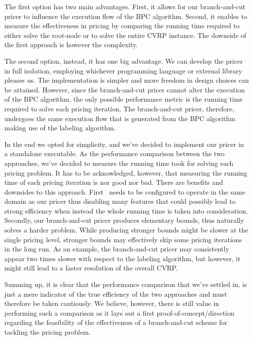 The first option has two main advantages.
First, it allows for our branch-and-cut pricer to influence the execution flow of the BPC algorithm.
Second, it enables to measure the effectiveness in pricing by comparing
the running time required to either solve the root-node or to solve the entire CVRP instance.
The downside of the first approach is however the complexity.

The second option, instead, it has one big advantage.
We can develop the pricer in full isolation, employing whichever programming
language or external library pleases us.
The implementation is simpler and more freedom in design choices can be attained.
However, since the branch-and-cut pricer cannot alter the execution of the BPC algorithm,
the only possible performance metric is the running time required to solve
each pricing iteration.
The branch-and-cut pricer, therefore, undergoes
the same execution flow that is generated from the BPC algorithm making use of the labeling algorithm.

\medskip

In the end we opted for simplicity, and we've decided to implement our pricer in a standalone executable.
As the performance comparison between the two approaches, we've decided to measure
the running time took for solving each pricing problem.
It has to be acknowledged, however, that measuring the running time of each pricing iteration
is nor good nor bad.
There are benefits and downsides to this approach.
First \bapcod\ needs to be configured to operate in the same domain as our pricer
thus disabling many features that could possibly lead to strong efficiency
when instead the whole running time is taken into consideration.
Secondly, our branch-and-cut pricer produces elementary bounds, thus naturally solves a harder problem.
While producing stronger bounds might be slower at the single pricing level, stronger bounds
may effectively skip some pricing iterations in the long run.
As an example, the branch-and-cut pricer may consistently appear two times slower with
respect to the labeling algorithm, but however, it might still
lead to a faster resolution of the overall CVRP.

Summing up, it is clear that the performance comparison that we've settled in, is just
a mere indicator of the true efficiency of the two approaches and must
therefore be taken cautiously.
We believe, however, there is still value in performing such a comparison as it lays
out a first proof-of-concept/direction regarding the feasibility of the effectiveness
of a branch-and-cut scheme for tackling the pricing problem.

